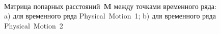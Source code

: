\begin{figure}[h!t]\center
{}
\\
\caption{Матрица попарных расстояний~$\textbf{M}$ между точками временного ряда: a) для временного ряда Physical~Motion~1; b) для временного ряда Physical~Motion~2}
\label{fig_real_distance}
\end{figure}

